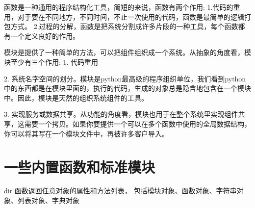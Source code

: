 \documentclass[twoside,11pt]{book}
\begin{document}
函数是一种通用的程序结构化工具，简短的来说，函数有两个作用:
1.代码的重用，对于要在不同地方，不同时间，不止一次使用的代码，函数是最简单的逻辑打包方式。
2.过程的分解，函数是把系统分割成许多片段的一种工具，每个函数都有一个定义良好的作用。

模块是提供了一种简单的方法，可以把组件组织成一个系统。从抽象的角度看，模块至少有三个作用:
1. 代码重用

2. 系统名字空间的划分。模块是python最高级的程序组织单位，我们看到python中的东西都是在模块里面的，执行的代码，生成的对象总是隐含地包含在一个模块中。因此，模块是天然的组织系统组件的工具。

3. 实现服务或数据共享。从功能的角度看，模块也用于在整个系统里实现组件共享，这需要一个拷贝。如果你要提供一个可以在多个函数中使用的全局数据结构，你可以将其写在一个模块文件中，再被许多客户导入。



\section{一些内置函数和标准模块}

dir 函数返回任意对象的属性和方法列表， 包括模块对象、函数对象、字符串对象、列表对象、字典对象
\end{document}
